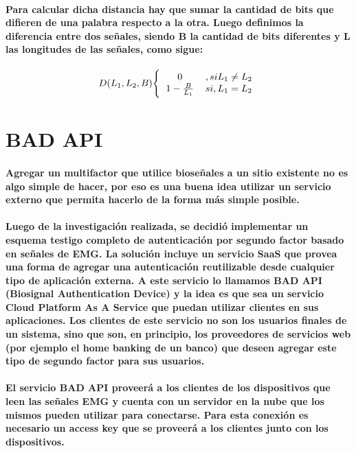 \documentclass{article}
\begin{document}
\paragraph{
Para calcular dicha distancia hay que sumar la cantidad de bits que difieren de una palabra respecto a la otra. Luego definimos la diferencia entre dos señales, siendo B la cantidad de bits diferentes y L las longitudes de las señales, como sigue:
}

\begin{center}\label{eq:hamming}
\[
D(L_1, L_2, B)
\Bigg\{
  \begin{tabular}{ c c }
  0 & $, si L_1 \neq L_2$ \\
  $1 - \frac{B}{L_1}$ & $si, L_1 = L_2$
  \end{tabular}
\]
\end{center}

\section{BAD API}
\paragraph{
Agregar un multifactor que utilice bioseñales a un sitio existente no es algo simple de hacer, por eso es una buena idea utilizar un servicio externo que permita hacerlo de la forma más simple posible.
}
\paragraph{
Luego de la investigación realizada, se decidió implementar un esquema testigo completo de autenticación por segundo factor basado en señales de EMG.  La solución incluye un servicio SaaS que provea una forma de agregar una autenticación reutilizable desde cualquier tipo de aplicación externa. A este servicio lo llamamos BAD API (Biosignal Authentication Device) y la idea es que sea un servicio Cloud Platform As A Service que puedan utilizar clientes en sus aplicaciones. Los clientes de este servicio no son los usuarios finales de un sistema, sino que son, en principio, los proveedores de servicios web (por ejemplo el home banking de un banco) que deseen agregar este tipo de segundo factor para sus usuarios.
}
\paragraph{
El servicio BAD API proveerá a los clientes de los dispositivos que leen las señales EMG y cuenta con un servidor en la nube que los mismos pueden utilizar para conectarse. Para esta conexión es necesario un access key que se proveerá a los clientes junto con los dispositivos.
}
\end{document}
